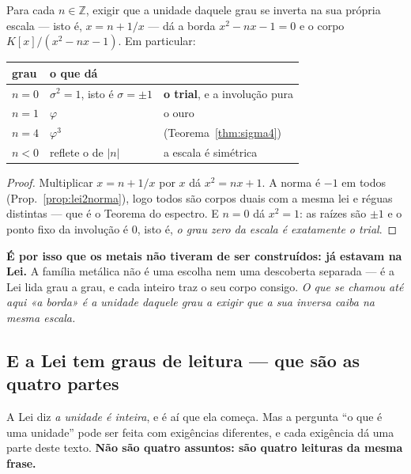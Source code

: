 \documentclass[livro.tex]{subfiles}
\begin{document}
\begin{teorema}\label{thm:graucorpo}
Para cada $n\in\mathbb{Z}$, exigir que a unidade daquele grau se inverta na sua própria escala ---
isto é, $x = n + 1/x$ --- dá a borda $x^{2}-nx-1=0$ e o corpo $K[x]/(x^{2}-nx-1)$. Em particular:
\begin{center}\small
\begin{tabular}{@{}lll@{}}
\toprule
grau & o que dá & \\
\midrule
$n=0$ & $\sigma^{2}=1$, isto é $\sigma=\pm1$ & \textbf{o trial}, e a involução pura \\
$n=1$ & $\varphi$ & o ouro \\
$n=4$ & $\varphi^{3}$ & (Teorema~\ref{thm:sigma4}) \\
$n<0$ & reflete o de $|n|$ & a escala é simétrica \\
\bottomrule
\end{tabular}
\end{center}
\end{teorema}

\begin{proof}
Multiplicar $x=n+1/x$ por $x$ dá $x^{2}=nx+1$. A norma é $-1$ em todos (Prop.~\ref{prop:lei2norma}),
logo todos são corpos duais com a mesma lei e réguas distintas --- que é o Teorema do espectro. E
$n=0$ dá $x^{2}=1$: as raízes são $\pm1$ e o ponto fixo da involução é $0$, isto é, \emph{o grau
zero da escala é exatamente o trial}.
\end{proof}

\noindent \textbf{É por isso que os metais não tiveram de ser construídos: já estavam na Lei.} A
família metálica não é uma escolha nem uma descoberta separada --- é a Lei lida grau a grau, e cada
inteiro traz o seu corpo consigo. \emph{O que se chamou até aqui «a borda» é a unidade daquele grau
a exigir que a sua inversa caiba na mesma escala.}


\subsection{E a Lei tem graus de leitura --- que são as quatro partes}\label{sec:grausleitura}

\noindent A Lei diz \emph{a unidade é inteira}, e é aí que ela começa. Mas a pergunta ``o que é
uma unidade'' pode ser feita com exigências diferentes, e cada exigência dá uma parte deste texto.
\textbf{Não são quatro assuntos: são quatro leituras da mesma frase.}
\end{document}
